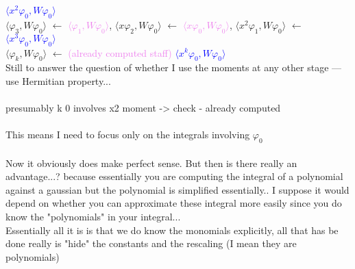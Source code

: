 \textcolor{blue}{$\langle x^2 \varphi_0, W \varphi_0 \rangle$}
\\
$\langle \varphi_3, W \varphi_0 \rangle$ 
$\leftarrow$  
\textcolor{violet}{$\langle \varphi_1, W \varphi_0 \rangle$},
$\langle x \varphi_2, W \varphi_0 \rangle$
$\leftarrow$  
\textcolor{violet}{$\langle x \varphi_0, W \varphi_0 \rangle$},
$\langle x^2 \varphi_1, W \varphi_0 \rangle$
$\leftarrow$  
\textcolor{blue}{$\langle x^3 \varphi_0, W \varphi_0 \rangle$}
\\
$\langle \varphi_k, W \varphi_0 \rangle$ 
$\leftarrow$  
\textcolor{violet}{(already computed staff)}
\textcolor{blue}{$\langle x^k \varphi_0, W \varphi_0 \rangle$}
\\
Still to answer the question of whether I use the moments at 
any other stage --- use Hermitian property...
\\
\\
presumably k 0 involves x2 moment -> check - already computed
\\
\\
This means I need to focus only on the integrals 
involving $\varphi_0$
\\
\\
Now it obviously does make perfect sense. But then is there
really an advantage...? because essentially you are 
computing the integral of a polynomial against a gaussian 
but the polynomial is simplified essentially.. I suppose it 
would depend on whether you can approximate these integral more 
easily since you do know the "polynomials" in your integral...
\\
Essentially all it is is that we do know the monomials explicitly, 
all that has be done really is "hide" the constants and the 
rescaling (I mean they are polynomials)
